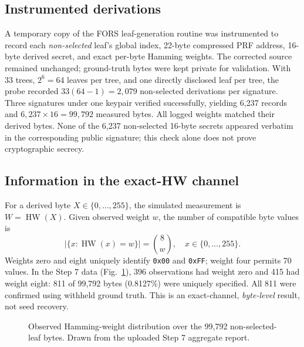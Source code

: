 \documentclass[conference,a4paper,10pt]{IEEEtran}
\begin{document}
\subsection{Instrumented derivations}
A temporary copy of the FORS leaf-generation routine was instrumented to record each \emph{non-selected} leaf's global index, 22-byte compressed PRF address, 16-byte derived secret, and exact per-byte Hamming weights. The corrected source remained unchanged; ground-truth bytes were kept private for validation. With 33 trees, $2^6=64$ leaves per tree, and one directly disclosed leaf per tree, the probe recorded $33(64-1)=2{,}079$ non-selected derivations per signature. Three signatures under one keypair verified successfully, yielding 6,237 records and $6{,}237\times16=99{,}792$ measured bytes. All logged weights matched their derived bytes. None of the 6,237 non-selected 16-byte secrets appeared verbatim in the corresponding public signature; this check alone does not prove cryptographic secrecy.

\subsection{Information in the exact-HW channel}
For a derived byte $X\in\{0,\ldots,255\}$, the simulated measurement is $W=\operatorname{HW}(X)$. Given observed weight $w$, the number of compatible byte values is
\begin{equation}
|\{x:\operatorname{HW}(x)=w\}|=\binom{8}{w},\quad x\in\{0,\ldots,255\}.
\label{eq:binomial}
\end{equation}
Weights zero and eight uniquely identify \texttt{0x00} and \texttt{0xFF}; weight four permits 70 values. In the Step 7 data (Fig.~\ref{fig:hist}), 396 observations had weight zero and 415 had weight eight: 811 of 99,792 bytes (0.8127\%) were uniquely specified. All 811 were confirmed using withheld ground truth. This is an exact-channel, \emph{byte-level} result, not seed recovery.

\begin{figure}[t]
\centering
{}
\caption{Observed Hamming-weight distribution over the 99,792 non-selected-leaf bytes. Drawn from the uploaded Step 7 aggregate report.}
\label{fig:hist}
\end{figure}
\end{document}
